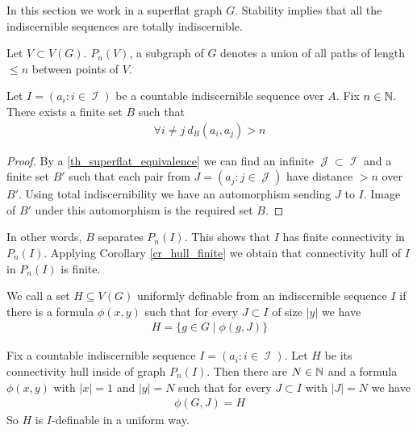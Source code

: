 \documentclass{amsart}
\DeclareMathOperator{\I}{\mathcal I}
\DeclareMathOperator{\J}{\mathcal J}
\begin{document}
In this section we work in a superflat graph $G$. Stability implies that all the indiscernible sequences are totally indiscernible.

\begin{Definition}
	Let $V \subset V(G)$. $P_n(V)$, a subgraph of $G$ denotes a union of all paths of length $\leq n$ between points of $V$.
\end{Definition}

\begin{Lemma}
	Let $I = (a_i : i \in \I)$ be a countable indiscernible sequence over $A$. Fix $n \in \mathbb{N}$.
	There exists a finite set $B$ such that
	\begin{align*}
		\forall i \neq j \ d_B(a_i, a_j) > n
	\end{align*}
\end{Lemma}

\begin{proof}
	By a \ref{th_superflat_equivalence} we can find an infinite $\J \subset \I$ and a finite set $B'$ such that each pair from $J = (a_j : j \in \J)$ have distance $>n$ over $B'$.
	Using total indiscernibility we have an automorphism sending $J$ to $I$.
	Image of $B'$ under this automorphism is the required set $B$.
\end{proof}

In other words, $B$ separates $P_n(I)$.
This shows that $I$ has finite connectivity in $P_n(I)$.
Applying Corollary \ref{cr_hull_finite} we obtain that connectivity hull of $I$ in $P_n(I)$ is finite.

\begin{Definition}
	We call a set $H \subseteq V(G)$ uniformly definable from an indiscernible sequence $I$ if there is a formula $\phi(x, y)$ such that for every $J \subset I$ of size $|y|$ we have
	\begin{align*}
		H = \{g \in G \mid \phi(g, J)\}
	\end{align*}
\end{Definition}

\begin{Lemma}
	Fix a countable indiscernible sequence $I = (a_i : i \in \I)$.
	Let $H$ be its connectivity hull inside of graph $P_n(I)$.
	Then there are $N \in \mathbb{N}$ and a formula $\phi(x, y)$ with $|x| = 1$ and $|y| = N$ such that for every $J \subset I$ with $|J| = N$ we have
	\begin{align*}
		\phi(G, J) = H
	\end{align*}
	So $H$ is $I$-definable in a uniform way.
\end{Lemma}
\end{document}
